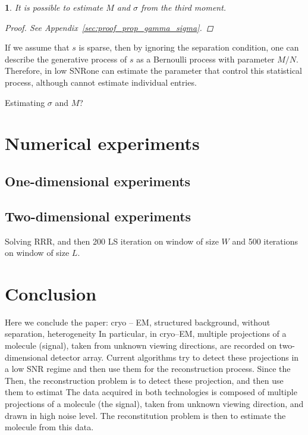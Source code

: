\documentclass[english,11pt]{article}
\numberwithin{equation}{section}
\theoremstyle{plain}
\theoremstyle{definition}
\theoremstyle{remark}
\theoremstyle{plain}
\theoremstyle{remark}
\theoremstyle{plain}
\theoremstyle{plain}
\newtheorem{proposition}[thm]{\protect\propositionname}
\providecommand{\propositionname}{Proposition}
\newcommand{\SNR}{{\textsf{SNR}}}
\begin{document}
\begin{proposition} \label{prop:gamma_sigma}
	It is possible to estimate $M$ and $\sigma$ from the third moment.
	\begin{proof}
		See Appendix~\ref{sec:proof_prop_gamma_sigma}.
	\end{proof}
\end{proposition}
If we assume that $s$ is sparse, then by ignoring the separation condition, one can describe the generative process of $s$ as a Bernoulli process with parameter $M/N$. Therefore, in low \SNR  one can estimate the parameter that control this statistical process, although cannot estimate individual entries.

Estimating $\sigma$ and $M$? 


\section{Numerical experiments}   \label{sec:numerics}

\subsection{One-dimensional experiments}


\subsection{Two-dimensional experiments}

Solving RRR, and then 200 LS iteration on window of size $W$ and 500 iterations on window of size $L$.

\section{Conclusion} 
Here we conclude the paper: cryo -- EM, structured background, without separation, heterogeneity
In particular, in cryo--EM, multiple projections of a molecule (signal), taken
from unknown viewing directions, are recorded on two-dimensional detector
array. Current algorithms try to detect these projections in a low SNR regime
and then use them for the reconstruction process. Since the
Then, the reconstruction problem is to detect these projection, and then use
them to estimat
The data acquired in both technologies is composed of multiple projections
of a molecule (the signal), taken from unknown viewing direction, and drawn in
high noise level. The reconstitution problem is then to estimate the molecule
from this data.
\end{document}
